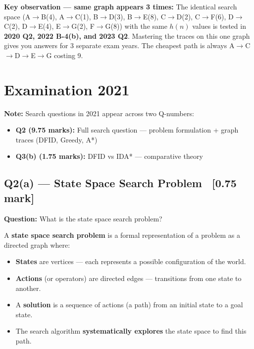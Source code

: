\documentclass[12pt, a4paper]{article}
\newenvironment{solutionbox}{\begin{mdframed}[style=solutionframe]}{\end{mdframed}}
\newenvironment{notesbox}{\begin{mdframed}[style=notesframe]}{\end{mdframed}}
\begin{document}
\begin{notesbox}
\textbf{Key observation — same graph appears 3 times:} The identical search space (A$\to$B(4), A$\to$C(1), B$\to$D(3), B$\to$E(8), C$\to$D(2), C$\to$F(6), D$\to$C(2), D$\to$E(4), E$\to$G(2), F$\to$G(8)) with the same $h(n)$ values is tested in \textbf{2020 Q2, 2022 B-4(b), and 2023 Q2}. Mastering the traces on this one graph gives you answers for 3 separate exam years. The cheapest path is always A$\to$C$\to$D$\to$E$\to$G costing 9.
\end{notesbox}

\newpage
\section{Examination 2021}

\textbf{Note:} Search questions in 2021 appear across two Q-numbers:
\begin{itemize}[noitemsep]
  \item \textbf{Q2 (9.75 marks):} Full search question — problem formulation + graph traces (DFID, Greedy, A*)
  \item \textbf{Q3(b) (1.75 marks):} DFID vs IDA* — comparative theory
\end{itemize}

\subsection{Q2(a) — State Space Search Problem \ [0.75 mark]}

\begin{solutionbox}
\textbf{Question:} What is the state space search problem?
\end{solutionbox}

A \textbf{state space search problem} is a formal representation of a problem as a directed graph where:
\begin{itemize}[noitemsep]
  \item \textbf{States} are vertices — each represents a possible configuration of the world.
  \item \textbf{Actions} (or operators) are directed edges — transitions from one state to another.
  \item A \textbf{solution} is a sequence of actions (a path) from an initial state to a goal state.
  \item The search algorithm \textbf{systematically explores} the state space to find this path.
\end{itemize}
\end{document}
